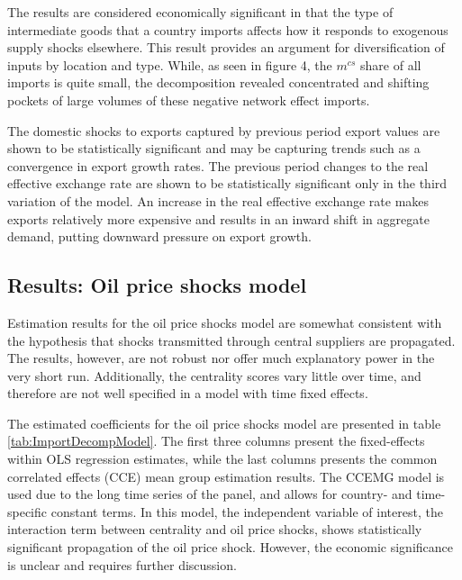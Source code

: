 \documentclass[10pt,letterpaper,pdftex]{article}
\begin{document}
The results are considered economically significant in that the type of intermediate goods that a country imports affects how it responds to exogenous supply shocks elsewhere. This result provides an argument for diversification of inputs by location and type. While, as seen in figure 4, the $m^{cs}$ share of all imports is quite small, the decomposition revealed concentrated and shifting pockets of large volumes of these negative network effect imports. 

The domestic shocks to exports captured by previous period export values are shown to be statistically significant and may be capturing trends such as a convergence in export growth rates. The previous period changes to the real effective exchange rate are shown to be statistically significant only in the third variation of the model. An increase in the real effective exchange rate makes exports relatively more expensive and results in an inward shift in aggregate demand, putting downward pressure on export growth.

\subsection{Results: Oil price shocks model} \label{results_oil}

Estimation results for the oil price shocks model are somewhat consistent with the hypothesis that shocks transmitted through central suppliers are propagated. The results, however, are not robust nor offer much explanatory power in the very short run. Additionally, the centrality scores vary little over time, and therefore are not well specified in a model with time fixed effects. 

The estimated coefficients for the oil price shocks model are presented in table \ref{tab:ImportDecompModel}. The first three columns present the fixed-effects within OLS regression estimates, while the last columns presents the common correlated effects (CCE) mean group estimation results. The CCEMG model is used due to the long time series of the panel, and allows for country- and time-specific constant terms. In this model, the independent variable of interest, the interaction term between centrality and oil price shocks, shows statistically significant propagation of the oil price shock. However, the economic significance is unclear and requires further discussion. 
\end{document}
